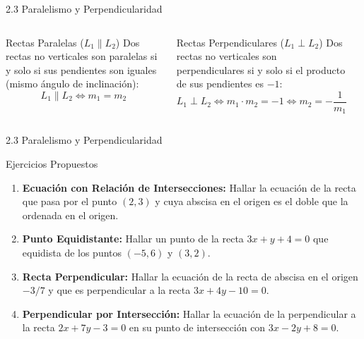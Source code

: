 \documentclass[10pt,aspectratio=169,spanish]{beamer}
\begin{document}
\begin{frame}{2.3 Paralelismo y Perpendicularidad}
\begin{columns}
  \begin{block}{Rectas Paralelas ($L_1 \parallel L_2$)}
  Dos rectas no verticales son paralelas si y solo si sus pendientes son iguales (mismo ángulo de inclinación):
  \[
    L_1 \parallel L_2 \iff m_1 = m_2
  \]
  \end{block}

  \begin{block}{Rectas Perpendiculares ($L_1 \perp L_2$)}
  Dos rectas no verticales son perpendiculares si y solo si el producto de sus pendientes es $-1$:
  \[
    L_1 \perp L_2 \iff m_1 \cdot m_2 = -1 \iff m_2 = -\frac{1}{m_1}
  \]
  \end{block}

  \begin{center}
  \end{center}
\end{columns}
\end{frame}


  \begin{frame}{2.3 Paralelismo y Perpendicularidad}
\begin{block}{Ejercicios Propuestos}
\begin{enumerate}
    \item \textbf{Ecuación con Relación de Intersecciones:} Hallar la ecuación de la recta que pasa por el punto $(2,3)$ y cuya abscisa en el origen es el doble que la ordenada en el origen.

    \item \textbf{Punto Equidistante:} Hallar un punto de la recta $3x + y + 4 = 0$ que equidista de los puntos $(-5, 6)$ y $(3, 2)$.

    \item \textbf{Recta Perpendicular:} Hallar la ecuación de la recta de abscisa en el origen $-3/7$ y que es perpendicular a la recta $3x + 4y - 10 = 0$.

    \item \textbf{Perpendicular por Intersección:} Hallar la ecuación de la perpendicular a la recta $2x + 7y - 3 = 0$ en su punto de intersección con $3x - 2y + 8 = 0$.
\end{enumerate}
\end{block}
\end{frame}
\end{document}
